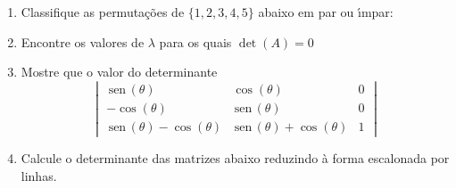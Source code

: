 \documentclass[a4paper,5pt]{amsbook}
\newcommand{\sen}{\,\mbox{sen}\,}
\begin{document}
\begin{enumerate}
	\vspace{0.5cm}
	\item Classifique as permuta\c{c}\~oes de $\{1, 2, 3, 4, 5\}$ abaixo em par ou
		\'{\i}mpar:


	\vspace{0.5cm}
	\item Encontre os valores de $\lambda$ para os quais $\det(A)=0$


	\vspace{0.5cm}
	\item Mostre que o valor do determinante
		\[\begin{vmatrix}
			\sen(\theta) & \cos(\theta) & 0 \\
			-\cos(\theta) & \sen(\theta) & 0 \\
			\sen(\theta)-\cos(\theta) & \sen(\theta)+\cos(\theta) & 1
		\end{vmatrix}\]

	\vspace{0.5cm}
	\item Calcule o determinante das matrizes abaixo reduzindo \`a forma
		escalonada por linhas.


\end{enumerate}
\end{document}
